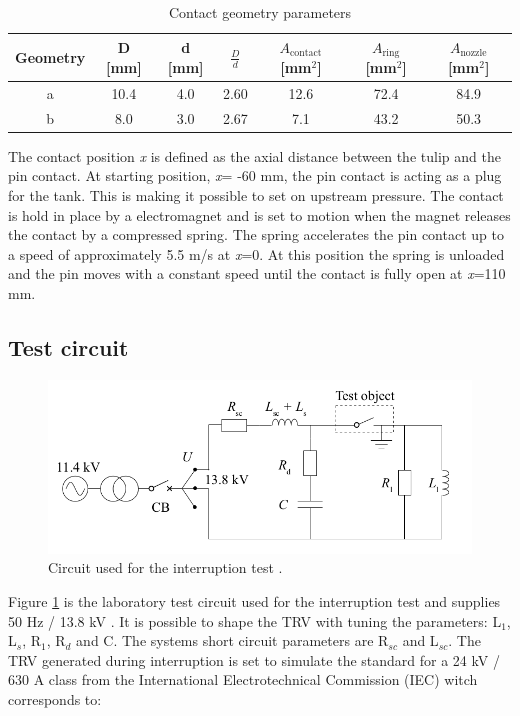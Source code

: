 \documentclass[10pt,a4paper]{article}
\begin{document}
\begin{table}[H]
\center
\caption{Contact geometry parameters}
 \begin{tabular}{|c|c|c|c|c|c|c|}
\hline 
Geometry & D [mm] & d [mm] & $\frac{D}{d}$ & $A_\mathrm{{contact}}$ [mm$^2$] & $A_\mathrm{{ring}}$ [mm$^2$] & $A_\mathrm{{nozzle}}$ [mm$^2$] \\ 
\hline 
a & 10.4 & 4.0 & 2.60 & 12.6 & 72.4 & 84.9 \\ 
\hline 
b & 8.0 & 3.0 & 2.67 & 7.1 & 43.2 & 50.3 \\ 
\hline 
\end{tabular} 
\label{tab:contGeoPara}
\end{table}

The contact position \textit{x} is defined as the axial distance between the tulip and the pin contact. At starting position, \textit{x}= -60 mm, the pin contact is acting as a plug for the tank. This is making it possible to set on upstream pressure. The contact is hold in place by a electromagnet and is set to motion when the magnet releases the contact by a compressed spring. The spring accelerates the pin contact up to a speed of approximately 5.5 m/s at \textit{x}=0. At this position the spring is unloaded  and the pin moves with a constant speed until the contact is fully open at \textit{x}=110 mm.

\subsection{Test circuit}

\begin{figure} [H]
\centering
\includegraphics[scale=0.3]{Bilder/Method/circuit.png}
\caption{Circuit used for the interruption test \cite{bib:AFIMVLBA}.} \label{fig:testCurcuit}
\end{figure}

Figure \ref{fig:testCurcuit} is the laboratory test circuit used for the interruption test and supplies 50 Hz / 13.8 kV . It is possible to shape the TRV with tuning the parameters: L$_1$, L$_s$, R$_1$, R$_d$ and C. The systems short circuit parameters are R$_{sc}$ and L$_{sc}$. The TRV generated during interruption is set to simulate the standard for a 24 kV / 630 A class from the International Electrotechnical Commission (IEC) witch corresponds to:
\end{document}
